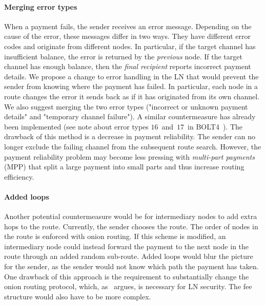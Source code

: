 \paragraph{Merging error types}
When a payment fails, the sender receives an error message.
Depending on the cause of the error, these messages differ in two ways.
They have different error codes and originate from different nodes.
In particular, if the target channel has insufficient balance, the error is returned by the \textit{previous} node.
If the target channel has enough balance, then the \textit{final recipient} reports incorrect payment details.
We propose a change to error handling in the LN that would prevent the sender from knowing where the payment has failed.
In particular, each node in a route changes the error it sends back as if it has originated from its own channel.
We also suggest merging the two error types ("incorrect or unknown payment details" and "temporary channel failure").
A similar countermeasure has already been implemented (see note about error types $16$~and~$17$~in BOLT4~\cite{Bolt4OnionRouting}).
The drawback of this method is a decrease in payment reliability.
The sender can no longer exclude the failing channel from the subsequent route search.
However, the payment reliability problem may become less pressing with \textit{multi-part payments} (MPP) that split a large payment into small parts and thus increase routing efficiency.

\paragraph{Added loops}
Another potential countermeasure would be for intermediary nodes to add extra hops to the route.
Currently, the sender chooses the route.
The order of nodes in the route is enforced with onion routing.
If this scheme is modified, an intermediary node could instead forward the payment to the next node in the route through an added random sub-route.
Added loops would blur the picture for the sender, as the sender would not know which path the payment has taken.
One drawback of this approach is the requirement to substantially change the onion routing protocol, which, as~\cite{Malavolta2019} argues, is necessary for LN security.
The fee structure would also have to be more complex.

